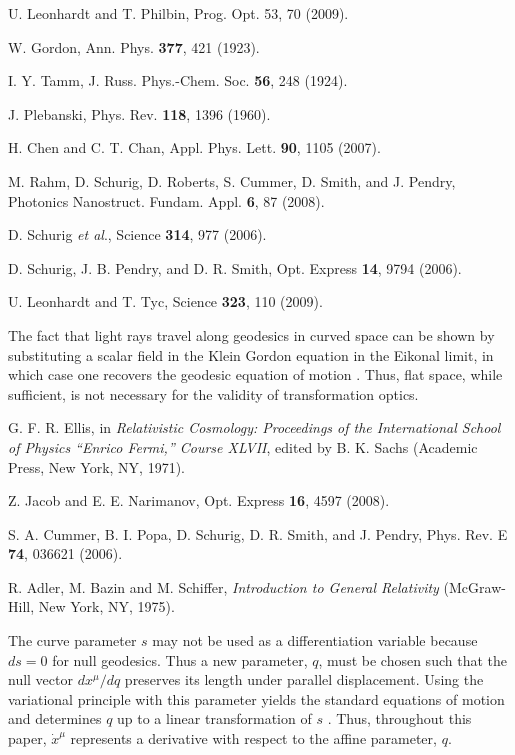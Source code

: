 \begin{thebibliography}{10}
U. Leonhardt and T. Philbin, Prog. Opt. 53, 70 (2009).

W. Gordon, Ann. Phys. \textbf{377}, 421 (1923).

I. Y. Tamm, J. Russ. Phys.-Chem. Soc. \textbf{56}, 248 (1924).

J. Plebanski, Phys. Rev. \textbf{118}, 1396 (1960).

H. Chen and C. T. Chan, Appl. Phys. Lett. \textbf{90}, 1105 (2007).

M. Rahm, D. Schurig, D. Roberts, S. Cummer, D. Smith, and J. Pendry, Photonics Nanostruct. Fundam. Appl. \textbf{6}, 87 (2008).

D. Schurig \textit{et al}., Science \textbf{314}, 977 (2006).

D. Schurig, J. B. Pendry, and D. R. Smith, Opt. Express \textbf{14}, 9794 (2006).

U. Leonhardt and T. Tyc, Science \textbf{323}, 110 (2009).

The fact that light rays travel along geodesics in curved space can be shown by substituting a scalar field in the Klein Gordon equation in the Eikonal limit, in which case one recovers the geodesic equation of motion \cite{ellis}. Thus, flat space, while sufficient, is not necessary for the validity of transformation optics.

G. F. R. Ellis, in \textit{Relativistic Cosmology: Proceedings of the International School of Physics ``Enrico Fermi,'' Course XLVII}, edited by B. K. Sachs (Academic Press, New York, NY, 1971).

Z. Jacob and E. E. Narimanov, Opt. Express \textbf{16}, 4597 (2008).

S. A. Cummer, B. I. Popa, D. Schurig, D. R. Smith, and J. Pendry, Phys. Rev. E \textbf{74}, 036621 (2006).

R. Adler, M. Bazin and M. Schiffer, \textit{Introduction to General Relativity} (McGraw-Hill, New York, NY, 1975).

The curve parameter $s$ may not be used as a differentiation variable because $ds=0$ for null geodesics. Thus a new parameter, $q$, must be chosen such that the null vector $dx^\mu/dq$ preserves its length under parallel displacement. Using the variational principle with this parameter yields the standard equations of motion and determines $q$ up to a linear transformation of $s$ \cite{schrodinger,ABS}. Thus, throughout this paper, $\dot{x}^\mu$ represents a derivative with respect to the affine parameter, $q$.


\end{thebibliography}
